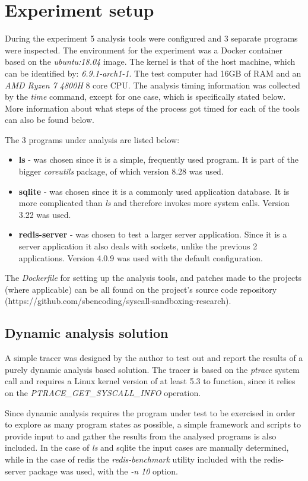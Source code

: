\section{Experiment setup}
\label{sec:setup}
During the experiment 5 analysis tools were configured and 3 separate programs were inspected.
The environment for the experiment was a Docker container based on the \textit{ubuntu:18.04} image.
The kernel is that of the host machine, which can be identified by: \textit{6.9.1-arch1-1}.
The test computer had 16GB of RAM and an \textit{AMD Ryzen 7 4800H} 8 core CPU.
The analysis timing information was collected by the \textit{time} command, except for one case, which is specifically stated below. More information about what steps of the process got timed for each of the tools can also be found below.

The 3 programs under analysis are listed below:
\begin{itemize}
    \item {\textbf{ls} - was chosen since it is a simple, frequently used program. It is part of the bigger \textit{coreutils} package, of which version 8.28 was used.}
    \item {\textbf{sqlite} - was chosen since it is a commonly used application database. It is more complicated than \textit{ls} and therefore invokes more system calls. Version 3.22 was used.}
    \item {\textbf{redis-server} - was chosen to test a larger server application. Since it is a server application it also deals with sockets, unlike the previous 2 applications. Version 4.0.9 was used with the default configuration.}
\end{itemize}

The \textit{Dockerfile} for setting up the analysis tools, and patches made to the projects (where applicable) can be all found on the project's source code repository (https://github.com/sbencoding/syscall-sandboxing-research).

\subsection {Dynamic analysis solution}
A simple tracer was designed by the author to test out and report the results of a purely dynamic analysis based solution.
The tracer is based on the \textit{ptrace} system call and requires a Linux kernel version of at least 5.3 to function, since it relies on the \textit{PTRACE\_GET\_SYSCALL\_INFO} operation.

Since dynamic analysis requires the program under test to be exercised in order to explore as many program states as possible, a simple framework and scripts to provide input to and gather the results from the analysed programs is also included. In the case of \textit{ls} and sqlite the input cases are manually determined, while in the case of redis the \textit{redis-benchmark} utility included with the redis-server package was used, with the \textit{-n 10} option.

